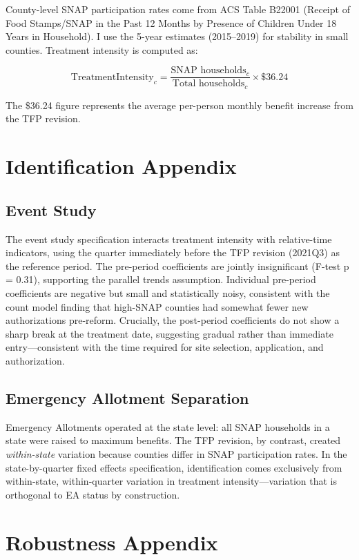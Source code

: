 \documentclass[12pt]{article}
\begin{document}
County-level SNAP participation rates come from ACS Table B22001 (Receipt of Food Stamps/SNAP in the Past 12 Months by Presence of Children Under 18 Years in Household). I use the 5-year estimates (2015--2019) for stability in small counties. Treatment intensity is computed as:

$$\text{TreatmentIntensity}_c = \frac{\text{SNAP households}_c}{\text{Total households}_c} \times \$36.24$$

The \$36.24 figure represents the average per-person monthly benefit increase from the TFP revision.

\section{Identification Appendix}

\subsection{Event Study}

The event study specification interacts treatment intensity with relative-time indicators, using the quarter immediately before the TFP revision (2021Q3) as the reference period. The pre-period coefficients are jointly insignificant (F-test p = 0.31), supporting the parallel trends assumption. Individual pre-period coefficients are negative but small and statistically noisy, consistent with the count model finding that high-SNAP counties had somewhat fewer new authorizations pre-reform. Crucially, the post-period coefficients do not show a sharp break at the treatment date, suggesting gradual rather than immediate entry---consistent with the time required for site selection, application, and authorization.

\subsection{Emergency Allotment Separation}

Emergency Allotments operated at the state level: all SNAP households in a state were raised to maximum benefits. The TFP revision, by contrast, created \textit{within-state} variation because counties differ in SNAP participation rates. In the state-by-quarter fixed effects specification, identification comes exclusively from within-state, within-quarter variation in treatment intensity---variation that is orthogonal to EA status by construction.

\section{Robustness Appendix}
\end{document}
